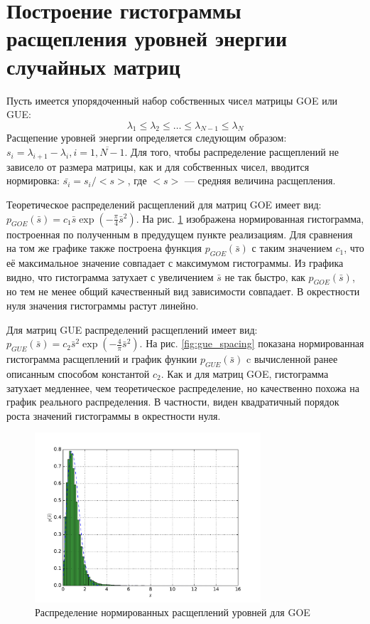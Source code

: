 \documentclass[a4paper]{article}
\begin{document}
\section{Построение гистограммы расщепления уровней энергии случайных матриц}
Пусть имеется упорядоченный набор собственных чисел матрицы GOE или GUE:
\begin{displaymath}
\lambda_1 \leqslant \lambda_2 \leqslant \dots \leqslant \lambda_{N-1} \leqslant \lambda_N
\end{displaymath}
Расщепение уровней энергии определяется следующим образом:
\(s_i = \lambda_{i+1}-\lambda_i, i=\overline{1,N-1}\). Для того, чтобы распределение
расщеплений не зависело от размера матрицы, как и для собственных чисел, вводится
нормировка: \(\bar{s_i}=s_i/<s>\), где \(<s>\) --- средняя величина расщепления.

Теоретическое распределений расщеплений для матриц GOE имеет вид:
\(p_{GOE}(\bar{s}) = c_1 \bar{s} \exp(-\frac{\pi}{4}\bar{s}^2)\). На рис. \ref{fig:goe_spacing}
изображена нормированная гистограмма, построенная по полученным в предудущем пункте
реализациям. Для сравнения на том же графике также построена функция \(p_{GOE}(\bar{s})\)
с таким значением \(c_1\), что её максимальное значение совпадает с максимумом гистограммы.
Из графика видно, что гистограмма затухает с увеличением \(\bar{s}\) не так быстро,
как \(p_{GOE}(\bar{s})\), но тем не менее общий качественный вид зависимости совпадает.
В окрестности нуля значения гистограммы растут линейно.

Для матриц GUE распределений расщеплений имеет вид:
\(p_{GUE}(\bar{s}) = c_2 \bar{s}^2 \exp(-\frac{4}{\pi}\bar{s}^2)\). На рис. \ref{fig:gue_spacing}
показана нормированная гистограмма расщеплений и график функии \(p_{GUE}(\bar{s})\) c
вычисленной ранее описанным способом константой \(c_2\). Как и для матриц GOE,
гистограмма затухает медленнее, чем теоретическое распределение, но качественно
похожа на график реального распределения. В частности, виден квадратичный порядок
роста значений гистограммы в окрестности нуля.

\begin{figure}[H]
	\center
	\includegraphics[width=0.75\textwidth]{../pictures/lab4_goe_spacing_hist.pdf}
	\caption{Распределение нормированных расщеплений уровней для GOE}
	\label{fig:goe_spacing}
\end{figure}
\end{document}
